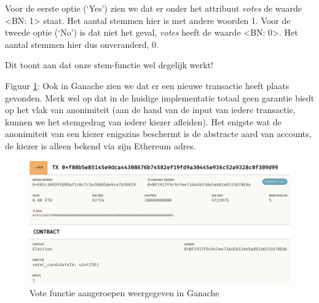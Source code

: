 	Voor de eerste optie (`Yes') zien we dat er onder het attribuut \textit{votes} de waarde <BN: 1> staat. Het aantal stemmen hier is met andere woorden 1.
	Voor de tweede optie (`No') is dat niet het geval, \textit{votes} heeft de  waarde <BN: 0>. Het aantal stemmen hier dus onveranderd, 0.
	
	Dit toont aan dat onze stem-functie wel degelijk werkt! 
	
	Figuur \ref{fig:contracts-ganache3}: Ook in Ganache zien we dat er een  nieuwe transactie heeft plaats gevonden. Merk wel op dat in de huidige implementatie totaal geen garantie biedt op het vlak van anonimiteit (aan de hand van de input van iedere transactie, kunnen we het stemgedrag  van iedere kiezer afleiden). Het enigste wat de anonimiteit van een kiezer enigszins beschermt is de abstracte aard van accounts, de kiezer is alleen bekend via zijn Ethereum adres. 
	\begin{figure}
		\includegraphics[width=\linewidth]{img/contracts-ganache3.png}
		\caption{Vote functie aangeroepen weergegeven in Ganache}
		\label{fig:contracts-ganache3}
	\end{figure}
	\newpage
